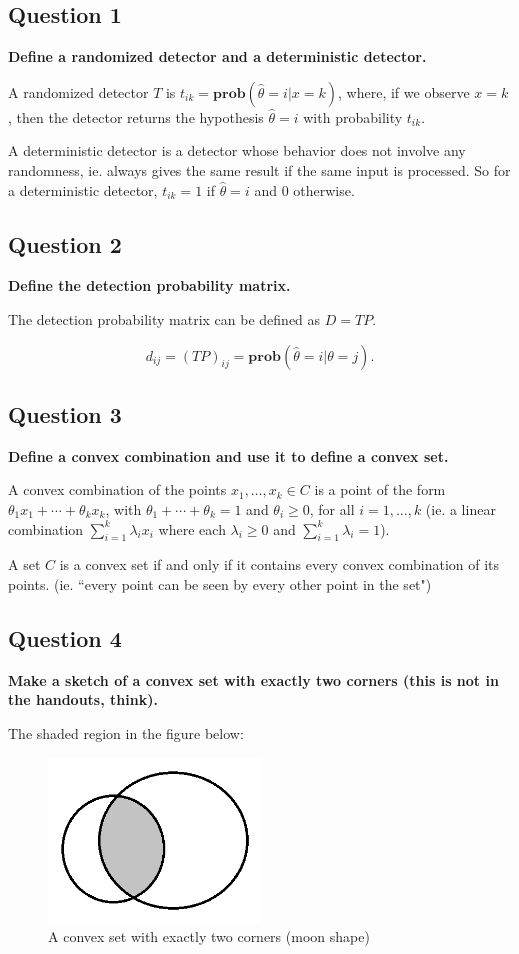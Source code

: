 \subsection*{Question 1}
\textbf{Deﬁne a randomized detector and a deterministic detector.}

A randomized detector $T$ is $t_{ik} = \textbf{prob}(\hat \theta = i | x = k)$, where, if we observe $x=k$, then the detector returns the hypothesis $\hat \theta = i$ with probability $t_{ik}$. 

A deterministic detector is a detector whose behavior does not involve any randomness, ie. always gives the same result if the same input is processed. So for a deterministic detector, $t_{ik} = 1$ if $\hat \theta = i$ and $0$ otherwise.


\subsection*{Question 2}
\textbf{Define the detection probability matrix.}

The detection probability matrix can be defined as $D = TP$. 

$$
d_{ij} = (TP)_{ij} = \textbf{prob}(\hat \theta = i | \theta = j).
$$

\subsection*{Question 3}
\textbf{Deﬁne a convex combination and use it to deﬁne a convex set.}

A convex combination of the points $x_1, \dots, x_k \in C$ is a point of the form $\theta_1 x_1 + \cdots+ \theta_k x_k$, with $\theta_1 + \cdots+\theta_k = 1$ and $\theta_i\ge 0$, for all $i = 1,\dots, k$ (ie. a linear combination \( \sum_{i=1}^k \lambda_i x_i \) where each \( \lambda_i \geq 0 \) and \( \sum_{i=1}^k \lambda_i = 1 \)).

A set $C$ is a convex set if and only if it contains every convex combination of its points. (ie. ``every point can be seen by every other point in the set")

\subsection*{Question 4}
\textbf{Make a sketch of a convex set with exactly two corners (this is not in the handouts, think).}

The shaded region in the figure below: 

\begin{figure}[h]
\centering
\includegraphics[width=0.5\textwidth]{iRAT/Images/image_2_1.png}
\caption{A convex set with exactly two corners (moon shape)}
\end{figure}


